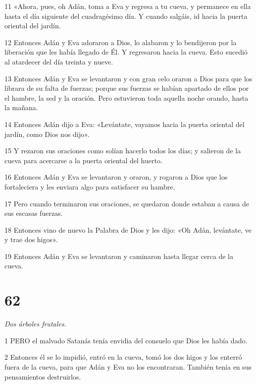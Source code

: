 \par 11 «Ahora, pues, oh Adán, toma a Eva y regresa a tu cueva, y permanece en ella hasta el día siguiente del cuadragésimo día. Y cuando salgáis, id hacia la puerta oriental del jardín.

\par 12 Entonces Adán y Eva adoraron a Dios, lo alabaron y lo bendijeron por la liberación que les había llegado de Él. Y regresaron hacia la cueva. Esto sucedió al atardecer del día treinta y nueve.

\par 13 Entonces Adán y Eva se levantaron y con gran celo oraron a Dios para que los librara de su falta de fuerzas; porque sus fuerzas se habían apartado de ellos por el hambre, la sed y la oración. Pero estuvieron toda aquella noche orando, hasta la mañana.

\par 14 Entonces Adán dijo a Eva: «Levántate, vayamos hacia la puerta oriental del jardín, como Dios nos dijo».

\par 15 Y rezaron sus oraciones como solían hacerlo todos los días; y salieron de la cueva para acercarse a la puerta oriental del huerto.

\par 16 Entonces Adán y Eva se levantaron y oraron, y rogaron a Dios que los fortaleciera y les enviara algo para satisfacer su hambre.

\par 17 Pero cuando terminaron sus oraciones, se quedaron donde estaban a causa de sus escasas fuerzas.

\par 18 Entonces vino de nuevo la Palabra de Dios y les dijo: «Oh Adán, levántate, ve y trae dos higos».

\par 19 Entonces Adán y Eva se levantaron y caminaron hasta llegar cerca de la cueva.

\chapter{62}

\par \textit{Dos árboles frutales.}

\par 1 PERO el malvado Satanás tenía envidia del consuelo que Dios les había dado.

\par 2 Entonces él se lo impidió, entró en la cueva, tomó los dos higos y los enterró fuera de la cueva, para que Adán y Eva no los encontraran. También tenía en sus pensamientos destruirlos.

